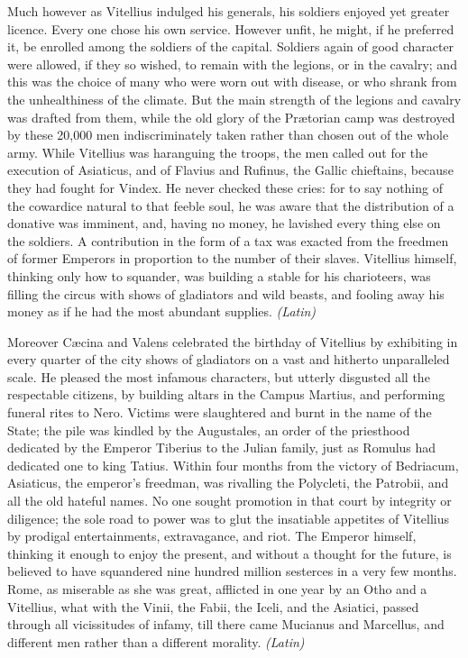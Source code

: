 
Much however as Vitellius indulged his generals, his soldiers enjoyed yet greater licence. Every one chose his own service. However unfit, he might, if he preferred it, be enrolled among the soldiers of the capital. Soldiers again of good character were allowed, if they so wished, to remain with the legions, or in the cavalry; and this was the choice of many who were worn out with disease, or who shrank from the unhealthiness of the climate. But the main strength of the legions and cavalry was drafted from them, while the old glory of the Prætorian camp was destroyed by these 20,000 men indiscriminately taken rather than chosen out of the whole army. While Vitellius was haranguing the troops, the men called out for the execution of Asiaticus, and of Flavius and Rufinus, the Gallic chieftains, because they had fought for Vindex. He never checked these cries: for to say nothing of the cowardice natural to that feeble soul, he was aware that the distribution of a donative was imminent, and, having no money, he lavished every thing else on the soldiers. A contribution in the form of a tax was exacted from the freedmen of former Emperors in proportion to the number of their slaves. Vitellius himself, thinking only how to squander, was building a stable for his charioteers, was filling the circus with shows of gladiators and wild beasts, and fooling away his money as if he had the most abundant supplies. \emph{(Latin)}


Moreover Cæcina and Valens celebrated the birthday of Vitellius by exhibiting in every quarter of the city shows of gladiators on a vast and hitherto unparalleled scale. He pleased the most infamous characters, but utterly disgusted all the respectable citizens, by building altars in the Campus Martius, and performing funeral rites to Nero. Victims were slaughtered and burnt in the name of the State; the pile was kindled by the Augustales, an order of the priesthood dedicated by the Emperor Tiberius to the Julian family, just as Romulus had dedicated one to king Tatius. Within four months from the victory of Bedriacum, Asiaticus, the emperor's freedman, was rivalling the Polycleti, the Patrobii, and all the old hateful names. No one sought promotion in that court by integrity or diligence; the sole road to power was to glut the insatiable appetites of Vitellius by prodigal entertainments, extravagance, and riot. The Emperor himself, thinking it enough to enjoy the present, and without a thought for the future, is believed to have squandered nine hundred million sesterces in a very few months. Rome, as miserable as she was great, afflicted in one year by an Otho and a Vitellius, what with the Vinii, the Fabii, the Iceli, and the Asiatici, passed through all vicissitudes of infamy, till there came Mucianus and Marcellus, and different men rather than a different morality. \emph{(Latin)}

